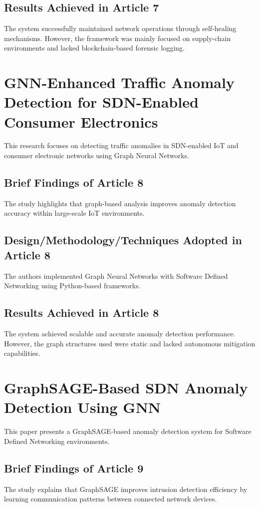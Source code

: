 \documentclass[12pt,a4paper]{report}
\begin{document}
\subsection{Results Achieved in Article 7}
The system successfully maintained network operations through self-healing mechanisms. However, the framework was mainly focused on supply-chain environments and lacked blockchain-based forensic logging.

\section{GNN-Enhanced Traffic Anomaly Detection for SDN-Enabled Consumer Electronics \cite{paper8}}
This research focuses on detecting traffic anomalies in SDN-enabled IoT and consumer electronic networks using Graph Neural Networks.

\subsection{Brief Findings of Article 8}
The study highlights that graph-based analysis improves anomaly detection accuracy within large-scale IoT environments.

\subsection{Design/Methodology/Techniques Adopted in Article 8}
The authors implemented Graph Neural Networks with Software Defined Networking using Python-based frameworks.

\subsection{Results Achieved in Article 8}
The system achieved scalable and accurate anomaly detection performance. However, the graph structures used were static and lacked autonomous mitigation capabilities.

\section{GraphSAGE-Based SDN Anomaly Detection Using GNN \cite{paper9}}
This paper presents a GraphSAGE-based anomaly detection system for Software Defined Networking environments.

\subsection{Brief Findings of Article 9}
The study explains that GraphSAGE improves intrusion detection efficiency by learning communication patterns between connected network devices.
\end{document}
